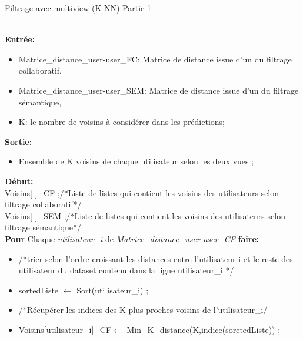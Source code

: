 \begin{algorithm}[H]
	\caption{Filtrage avec multiview (K-NN) Partie 1}
	\hspace*{\algorithmicindent} \\
	\hspace*{\algorithmicindent} \textbf{Entrée:} \begin{itemize}
		\item [] Matrice{\_}distance{\_}user-user{\_}FC: Matrice de distance issue d'un du filtrage collaboratif,
		\item [] Matrice{\_}distance{\_}user-user{\_}SEM: Matrice de distance issue d'un du filtrage sémantique,
		\item []  K: le nombre de voisins à considérer dans les prédictions;
	\end{itemize}
	\hspace*{\algorithmicindent} \textbf{Sortie:} 
	\begin{itemize}
		\item [] Ensemble de K voisins de chaque utilisateur selon les deux vues ;
	\end{itemize}
	
	\hspace*{\algorithmicindent}\textbf{ Début:}
	\hspace*{\algorithmicindent}\\Voisins[ ]{\_}CF ;/*Liste de listes qui contient les voisins des utilisateurs selon filtrage collaboratif*/
	\hspace*{\algorithmicindent}\\ Voisins[ ]{\_}SEM ;/*Liste de listes qui contient les voisins des utilisateurs selon filtrage sémantique*/
\hspace*{\algorithmicindent}\\\textbf{Pour} Chaque \textit{utilisateur{\_}i} de \textit{ Matrice{\_}distance{\_}user-user{\_}CF} \textbf{faire:} 
		
		\begin{itemize}
			\item [] /*trier selon l'ordre croissant les distances entre l'utilisateur i et le reste des utilisateur du dataset contenu dans la ligne utilisateur{\_}i */
			\item []	sortedListe $\leftarrow$ Sort(utilisateur{\_}i) ;
			\item []	/*Récupérer les indices des K plus proches voisins de l'utilisateur{\_}i/
			\item [] Voisins[utilisateur{\_}i]{\_}CF$\leftarrow$ Min{\_}K{\_}distance(K,indice(soretedListe)) ;
			

\end{itemize}
\end{algorithm}

